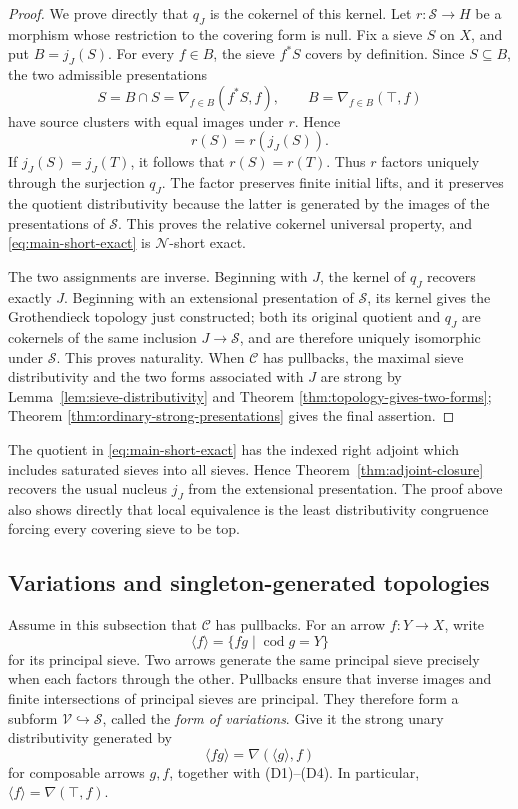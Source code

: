 \documentclass[12pt,oneside,reqno]{amsart}
\theoremstyle{definition}
\theoremstyle{remark}
\newcommand{\C}{\mathcal C}
\newcommand{\Null}{\mathcal N}
\newcommand{\Sieve}{\mathscr S}
\newcommand{\Var}{\mathscr V}
\newcommand{\prin}[1]{\langle #1\rangle}
\begin{document}
\begin{proof}
We prove directly that \(q_J\) is the cokernel of this kernel.  Let
\(r:\Sieve\to H\) be a morphism whose restriction to the covering form
is null.  Fix a sieve \(S\) on \(X\), and
put \(B=j_J(S)\).  For every \(f\in B\), the sieve \(f^*S\) covers by
definition.  Since \(S\subseteq B\), the two admissible presentations
\[
 S=B\cap S=\nabla_{f\in B}(f^*S,f),
 \qquad
 B=\nabla_{f\in B}(\top,f)
\]
have source clusters with equal images under \(r\).  Hence
\[
                              r(S)=r(j_J(S)).
\]
If \(j_J(S)=j_J(T)\), it follows that \(r(S)=r(T)\).  Thus \(r\)
factors uniquely through the surjection \(q_J\).  The factor preserves
finite initial lifts, and it preserves the quotient distributivity
because the latter is generated by the images of the presentations of
\(\Sieve\).  This proves the relative cokernel universal property, and
\eqref{eq:main-short-exact} is \(\Null\)-short exact.

The two assignments are inverse.  Beginning with \(J\), the kernel of
\(q_J\) recovers exactly \(J\).  Beginning with an extensional
presentation of \(\Sieve\), its kernel gives the Grothendieck topology
just constructed;
both its original quotient and \(q_J\) are cokernels of the same
inclusion \(J\to\Sieve\), and are therefore uniquely isomorphic under
\(\Sieve\).  This proves naturality.  When \(\C\) has pullbacks, the
maximal sieve distributivity and the two forms associated with \(J\)
are strong by Lemma~\ref{lem:sieve-distributivity} and Theorem
\ref{thm:topology-gives-two-forms}; Theorem
\ref{thm:ordinary-strong-presentations} gives the final assertion.
\end{proof}

The quotient in \eqref{eq:main-short-exact} has the indexed right
adjoint which includes saturated sieves into all sieves.  Hence
Theorem~\ref{thm:adjoint-closure} recovers the usual nucleus \(j_J\)
from the extensional presentation.  The proof above also shows directly
that local equivalence is the least distributivity congruence forcing
every covering sieve to be top.

\subsection{Variations and singleton-generated topologies}

Assume in this subsection that \(\C\) has pullbacks.  For an arrow
\(f:Y\to X\), write
\[
                  \prin f=\{fg\mid \operatorname{cod}g=Y\}
\]
for its principal sieve.  Two arrows generate the same principal sieve
precisely when each factors through the other.  Pullbacks ensure that
inverse images and finite intersections of principal sieves are
principal.  They therefore form a subform
\(\Var\hookrightarrow\Sieve\), called the \emph{form of variations}.
Give it the strong unary distributivity generated by
\[
                  \prin{fg}=\nabla(\prin g,f)
\]
for composable arrows \(g,f\), together with (D1)--(D4).  In
particular, \(\prin f=\nabla(\top,f)\).
\end{document}
